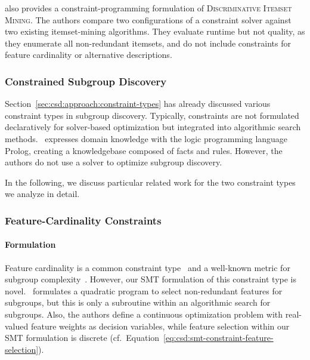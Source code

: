 \documentclass{article}
\theoremstyle{definition}
\begin{document}
\cite{guns2011itemset} also provides a constraint-programming formulation of \textsc{Discriminative Itemset Mining}.
The authors compare two configurations of a constraint solver against two existing itemset-mining algorithms.
They evaluate runtime but not quality, as they enumerate all non-redundant itemsets, and do not include constraints for feature cardinality or alternative descriptions.

\subsubsection{Constrained Subgroup Discovery}
\label{sec:csd:related-work:subgroup-discovery:constraints}

Section~\ref{sec:csd:approach:constraint-types} has already discussed various constraint types in subgroup discovery.
Typically, constraints are not formulated declaratively for solver-based optimization but integrated into algorithmic search methods.
\cite{atzmueller2007using}~expresses domain knowledge with the logic programming language Prolog, creating a knowledgebase composed of facts and rules.
However, the authors do not use a solver to optimize subgroup discovery.

In the following, we discuss particular related work for the two constraint types we analyze in detail.

\subsubsection{Feature-Cardinality Constraints}
\label{sec:csd:related-work:subgroup-discovery:cardinality}

\paragraph{Formulation}

Feature cardinality is a common constraint type~\cite{meeng2021real} and a well-known metric for subgroup complexity~\cite{atzmueller2015subgroup, helal2016subgroup, herrera2011overview, ventura2018subgroup}.
However, our SMT formulation of this constraint type is novel.
\cite{li2015efficient}~formulates a quadratic program to select non-redundant features for subgroups, but this is only a subroutine within an algorithmic search for subgroups.
Also, the authors define a continuous optimization problem with real-valued feature weights as decision variables, while feature selection within our SMT formulation is discrete (cf.~Equation~\ref{eq:csd:smt-constraint-feature-selection}).
\end{document}
